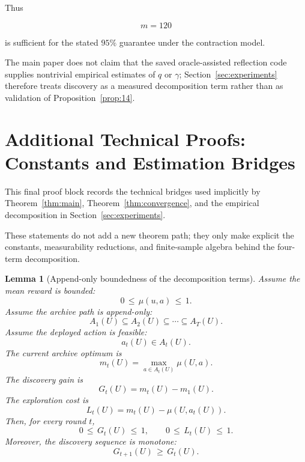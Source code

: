 \documentclass{article} %
\newtheorem{lemma}[theorem]{Lemma}
\begin{document}
Thus

\begin{equation}
\label{eq:app-fifth-contract-example-ceil}
m=120
\end{equation}

is sufficient for the stated \(95\%\) guarantee under the contraction model.

The main paper does not claim that the saved oracle-assisted reflection code supplies nontrivial empirical estimates of \(q\) or \(\gamma\); Section~\ref{sec:experiments} therefore treats discovery as a measured decomposition term rather than as validation of Proposition~\ref{prop:14}.

\section{Additional Technical Proofs: Constants and Estimation Bridges}

\label{app:proofs6}

This final proof block records the technical bridges used implicitly by Theorem~\ref{thm:main}, Theorem~\ref{thm:convergence}, and the empirical decomposition in Section~\ref{sec:experiments}.

These statements do not add a new theorem path; they only make explicit the constants, measurability reductions, and finite-sample algebra behind the four-term decomposition.

\begin{lemma}[Append-only boundedness of the decomposition terms]
\label{lem:15}
Assume the mean reward is bounded:
\begin{equation}
\label{eq:app-six-bounded-mu}
0 \,\le\, \mu(u,a) \,\le\, 1 .
\end{equation}
Assume the archive path is append-only:
\begin{equation}
\label{eq:app-six-append-only}
A_1(U) \subseteq A_2(U) \subseteq \cdots \subseteq A_T(U).
\end{equation}
Assume the deployed action is feasible:
\begin{equation}
\label{eq:app-six-feasible-action}
a_t(U)\in A_t(U).
\end{equation}
The current archive optimum is
\begin{equation}
\label{eq:app-six-current-optimum}
m_t(U)=\max_{a\in A_t(U)}\mu(U,a).
\end{equation}
The discovery gain is
\begin{equation}
\label{eq:app-six-discovery-repeat}
G_t(U)=m_t(U)-m_1(U).
\end{equation}
The exploration cost is
\begin{equation}
\label{eq:app-six-learning-repeat}
L_t(U)=m_t(U)-\mu(U,a_t(U)).
\end{equation}
Then, for every round \(t\),
\begin{equation}
\label{eq:app-six-bounds-GL}
0\,\le\, G_t(U)\,\le\, 1,
\qquad
0\,\le\, L_t(U)\,\le\, 1.
\end{equation}
Moreover, the discovery sequence is monotone:
\begin{equation}
\label{eq:app-six-G-monotone}
G_{t+1}(U)\,\ge\, G_t(U).
\end{equation}
\end{lemma}
\end{document}
